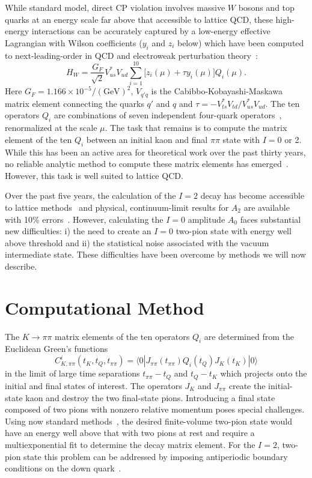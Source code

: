 \documentclass[aps,prl,
superscriptaddress,
showpacs,
preprintnumbers,
bibnotes,
amsmath,
amssymb,
twocolumn,
floatfix,
]{revtex4-1}
\begin{document}
While standard model, direct CP violation involves massive $W$ bosons and top quarks at an energy scale far above that accessible to lattice QCD, these high-energy interactions can be accurately captured by a low-energy effective Lagrangian with Wilson coefficients ($y_i$ and $z_i$ below) which have been computed to next-leading-order in QCD and electroweak perturbation theory~\cite{Buchalla:1995vs}:
\begin{equation}
H_W = \frac{G_F}{\sqrt{2}}V_{us}^*V_{ud}\sum_{i=1}^{10} \bigl[z_i(\mu) + \tau y_i(\mu)\bigr] Q_i(\mu).
\label{eq:H_W}
\end{equation}
Here $G_F = 1.166 \times 10^{-5}/(\mathrm{GeV})^{2}$, $V_{q'q}$ is the Cabibbo-Kobayashi-Maskawa matrix element connecting the quarks $q'$ and $q$ and $\tau =  -V_{ts}^* V_{td}/V_{us}^* V_{ud}$.  The ten operators $Q_i$ are combinations of seven independent four-quark operators~\cite{Blum:2001xb}, renormalized at the scale $\mu$.  The task that remains is to compute the matrix element of the ten $Q_i$ between an initial kaon and final $\pi\pi$ state with $I=0$ or 2.  While this has been an active area for theoretical work over the past thirty years, no reliable analytic method to compute these matrix elements has emerged~\cite{Buras:1999if, Ciuchini:2000zz, Bertolini:1998vd, Pich:2004ee}.  However, this task is well suited to lattice QCD.

Over the past five years, the calculation of the $I=2$ decay has become accessible to lattice methods~\cite{Blum:2011ng,Blum:2012uk} and physical, continuum-limit results for $A_2$ are available with 10\% errors~\cite{Blum:2015ywa}.  However, calculating the $I=0$ amplitude $A_0$ faces substantial new difficulties: i) the need to create an $I=0$ two-pion state with energy well above threshold and ii) the statistical noise associated with the vacuum intermediate state.  These difficulties have been overcome by methods we will now describe.

\section{Computational Method}

The $K\to\pi\pi$ matrix elements of the ten operators $Q_i$ are determined from the Euclidean Green's functions 
\begin{equation}
C^i_{K,\pi\pi}(t_K,t_Q,t_{\pi\pi}) = \bigl\langle 0| J_{\pi\pi}(t_{\pi\pi}) Q_i(t_Q) J_K(t_K)|0 \bigr\rangle
\label{eq:3pt}
\end{equation}
in the limit of large time separations $t_{\pi\pi}-t_Q$ and $t_Q-t_K$ which projects onto the initial and final states of interest.  The operators $J_K$ and $J_{\pi\pi}$ create the initial-state kaon and destroy the two final-state pions.  Introducing a final state composed of two pions with nonzero relative momentum poses special challenges.  Using now standard methods~\cite{Lellouch:2000pv}, the desired finite-volume two-pion state would have an energy well above that with two pions at rest and require a multiexponential fit to determine the decay matrix element.  For the $I=2$, two-pion state this problem can be addressed by imposing antiperiodic boundary conditions on the down quark~\cite{Kim:2005gka,Blum:2011ng}.
\end{document}
